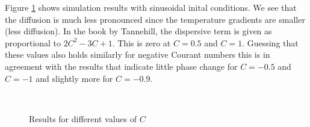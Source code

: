 \documentclass{article}
\begin{document}
Figure \ref{fig:cosdiffc} shows simulation results with sinusoidal inital conditions. We see that the diffusion is much less pronounced since the temperature gradients are smaller (less diffusion). In the book by Tannehill, the dispersive term is given as proportional to $2C^2-3C+1$. This is zero at $C = 0.5$ and $C=1$. Guessing that these values also holds similarly for negative Courant numbers this is in agreement with the results that indicate little phase change for $C=-0.5$ and $C=-1$ and slightly more for $C=-0.9$.

\begin{figure}
	 \\
	\caption{Results for different values of $C$}
	\label{fig:cosdiffc}
\end{figure}

\clearpage
\newpage

\end{document}
